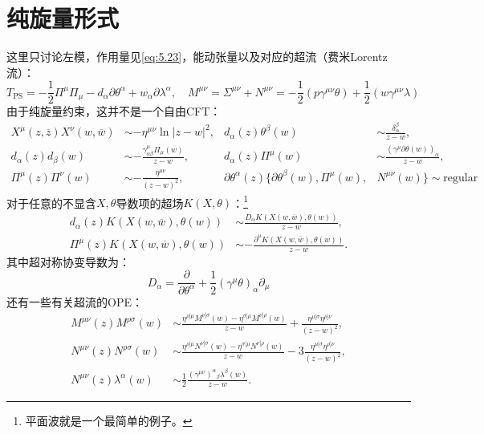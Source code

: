 \section{纯旋量形式}
这里只讨论左模，作用量见\ref{eq:5.23}，能动张量以及对应的超流（费米Lorentz流）：
\begin{equation}
	T_{\mathrm{PS}} = -\frac{1}{2} \Pi^\mu \Pi_\mu - d_\alpha \partial \theta^\alpha + w_\alpha \partial \lambda^\alpha, \quad M^{\mu\nu} = \Sigma^{\mu\nu} + N^{\mu\nu} = -\frac{1}{2} (p \gamma^{\mu\nu} \theta) + \frac{1}{2} (w \gamma^{\mu\nu} \lambda)
\end{equation}
由于纯旋量约束，这并不是一个自由CFT：
\begin{equation}
	\begin{aligned}
		X^\mu(z,\overline{z}) X^\nu(w,\overline{w}) 
		&\sim -\eta^{\mu\nu} \ln|z-w|^2, 
		& d_\alpha(z) \theta^\beta(w) 
		&\sim \frac{\delta_\alpha^\beta}{z-w}, \\
		d_\alpha(z) d_\beta(w) 
		&\sim -\frac{\gamma_{\alpha\beta}^\mu \Pi_\mu(w)}{z-w}, 
		& d_\alpha(z) \Pi^\mu(w) 
		&\sim \frac{(\gamma^\mu \partial\theta(w))_\alpha}{z-w}, \\
		\Pi^\mu(z) \Pi^\nu(w) 
		&\sim -\frac{\eta^{\mu\nu}}{(z-w)^2},&
		\partial\theta^\alpha(z) \{ \partial\theta^\beta(w),\Pi^\mu(w),&N^{\mu\nu}(w) \} \sim \mathrm{regular}
	\end{aligned}
\end{equation}
对于任意的不显含$X,\theta$导数项的超场$K(X,\theta)$：\footnote{平面波就是一个最简单的例子。}
\begin{equation}
	\begin{aligned}
		d_\alpha(z) K\left(X(w,\overline{w}), \theta(w)\right) 
		&\sim \frac{D_\alpha K\left(X(w,\overline{w}), \theta(w)\right)}{z-w}, \\
		\Pi^\mu(z) K\left(X(w,\overline{w}), \theta(w)\right) 
		&\sim -\frac{\partial^\mu K\left(X(w,\overline{w}), \theta(w)\right)}{z-w}.
	\end{aligned}
\end{equation}
其中超对称协变导数为：
\begin{equation}
	D_\alpha=\frac{\partial}{\partial\theta^\alpha}+\frac{1}{2}(\gamma^\mu\theta)_\alpha\partial_\mu
\end{equation}
还有一些有关超流的OPE：
\begin{equation}
	\begin{aligned}
		M^{\mu\nu}(z) M^{\rho\sigma}(w) 
		&\sim \frac{\eta^{\rho[\mu} M^{\nu]\sigma}(w) - \eta^{\sigma[\mu} M^{\nu]\rho}(w)}{z-w} + \frac{\eta^{\mu[\sigma} \eta^{\rho]\nu}}{(z-w)^2}, \\
		N^{\mu\nu}(z) N^{\rho\sigma}(w) 
		&\sim \frac{\eta^{\rho[\mu} N^{\nu]\sigma}(w) - \eta^{\sigma[\mu} N^{\nu]\rho}(w)}{z-w} - 3 \frac{\eta^{\mu[\sigma} \eta^{\rho]\nu}}{(z-w)^2}, \\
		N^{\mu\nu}(z) \lambda^\alpha(w) 
		&\sim \frac{1}{2} \frac{(\gamma^{\mu\nu})^\alpha{}_\beta \lambda^\beta(w)}{z-w}.
	\end{aligned}
\end{equation}